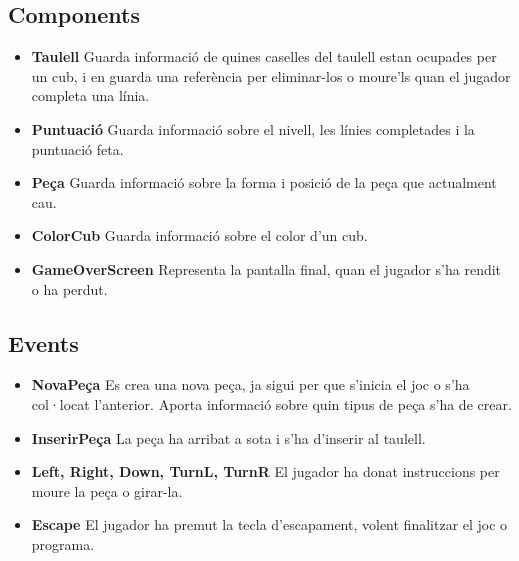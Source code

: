     \subsection{Components}

      \begin{itemize}
        \item {\bf Taulell}
          Guarda informació de quines caselles del taulell estan ocupades per un cub, i en guarda una referència per eliminar-los o moure'ls quan el jugador completa una línia.
          
        \item {\bf Puntuació}
          Guarda informació sobre el nivell, les línies completades i la puntuació feta.
          
        \item {\bf Peça}
          Guarda informació sobre la forma i posició de la peça que actualment cau.
          
        \item {\bf ColorCub}
          Guarda informació sobre el color d'un cub.
          
        \item {\bf GameOverScreen}
          Representa la pantalla final, quan el jugador s'ha rendit o ha perdut.
          
      \end{itemize}

    \subsection{Events}

      \begin{itemize}
        \item {\bf NovaPeça}
          Es crea una nova peça, ja sigui per que s'inicia el joc o s'ha col·locat l'anterior. Aporta informació sobre quin tipus de peça s'ha de crear.
          
        \item {\bf InserirPeça}
          La peça ha arribat a sota i s'ha d'inserir al taulell.
          
        \item {\bf Left, Right, Down, TurnL, TurnR}
          El jugador ha donat instruccions per moure la peça o girar-la.
          
        \item {\bf Escape}
          El jugador ha premut la tecla d'escapament, volent finalitzar el joc o programa.
          
      \end{itemize}


